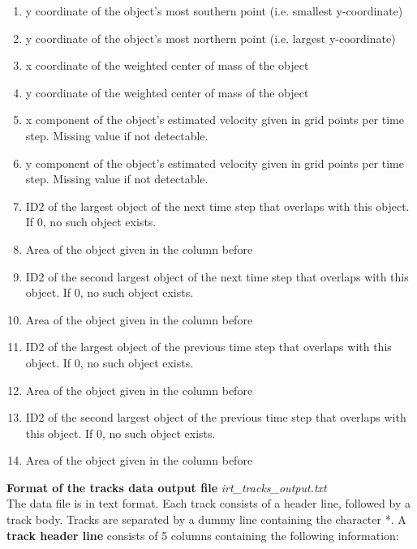 \documentclass[11pt]{article}
\begin{document}
\begin{enumerate}
\item y coordinate of the object's most southern point (i.e. smallest y-coordinate)
\item y coordinate of the object's most northern point (i.e. largest y-coordinate)
\item x coordinate of the weighted center of mass of the object
\item y coordinate of the weighted center of mass of the object
\item x component of the object's estimated velocity given in grid points per time step. Missing value if not detectable.
\item y component of the object's estimated velocity given in grid points per time step. Missing value if not detectable.
\item ID2 of the largest object of the next time step that overlaps with this object. If 0, no such object exists.
\item Area of the object given in the column before
\item ID2 of the second largest object of the next time step that overlaps with this object. If 0, no such object exists.
\item Area of the object given in the column before
\item ID2 of the largest object of the previous time step that overlaps with this object. If 0, no such object exists.
\item Area of the object given in the column before
\item ID2 of the second largest object of the previous time step that overlaps with this object. If 0, no such object exists.
\item Area of the object given in the column before
\end{enumerate}\vspace{0.5cm}
{\bf Format of the tracks data output file} {\it irt\_tracks\_output.txt}\\
The data file is in text format. Each track consists of a header line, followed by a track body. Tracks are separated by a dummy line containing the character *.
A {\bf track header line} consists of 5 columns containing the following information:
\end{document}
